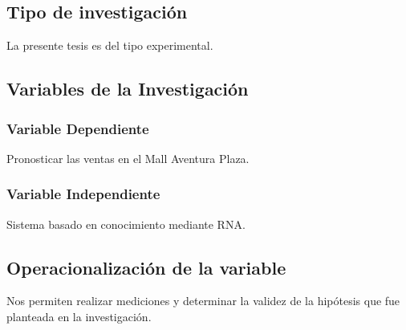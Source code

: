 \subsection{Tipo de investigación}
La presente tesis es del tipo experimental.

\subsection{Variables de la Investigación}
\subsubsection{Variable Dependiente}
Pronosticar las ventas en el Mall Aventura Plaza.
\subsubsection{Variable Independiente}
Sistema basado en conocimiento mediante RNA.

\subsection{Operacionalización de la variable}
Nos permiten realizar mediciones y determinar la validez de la hipótesis que fue planteada en la investigación. 

